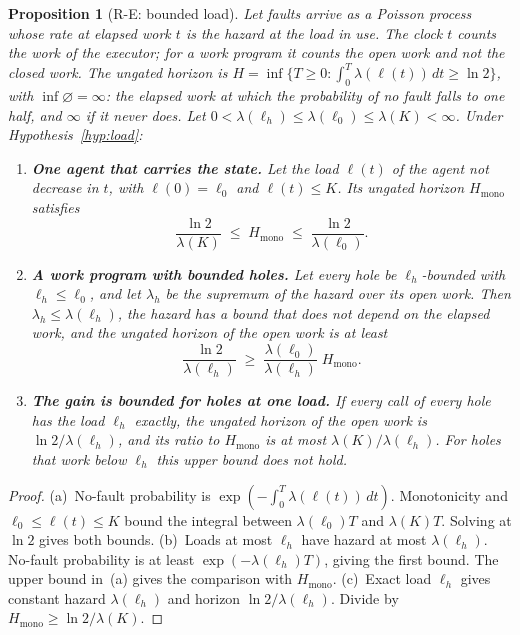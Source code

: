 \documentclass[11pt]{article}
\newtheorem{proposition}{Proposition}
\theoremstyle{definition}
\theoremstyle{remark}
\newcommand{\lh}{\ell_h}
\newcommand{\Hmono}{H_{\mathrm{mono}}}
\begin{document}
\begin{proposition}[R-E: bounded load]\label{prop:load}
Let faults arrive as a Poisson process whose rate at elapsed work $t$ is the hazard at the load in
use. The clock $t$ counts the work of the executor; for a work program it counts the open work and
not the closed work. The \emph{ungated horizon} is
$H=\inf\{T\ge0:\int_0^T\lambda(\ell(t))\,dt\ge\ln 2\}$, with $\inf\varnothing=\infty$: the elapsed
work at which the probability of no fault falls to one half, and $\infty$ if it never does. Let $0<\lambda(\lh)\le\lambda(\ell_0)\le\lambda(K)<\infty$. Under
Hypothesis~\ref{hyp:load}:
\begin{enumerate}[label=\textup{(\alph*)},leftmargin=2em,itemsep=3pt]
\item \textbf{One agent that carries the state.} Let the load $\ell(t)$ of the agent not decrease in
$t$, with $\ell(0)=\ell_0$ and $\ell(t)\le K$. Its ungated horizon $\Hmono$ satisfies
\[
\frac{\ln 2}{\lambda(K)}\;\le\;\Hmono\;\le\;\frac{\ln 2}{\lambda(\ell_0)} .
\]
\item \textbf{A work program with bounded holes.} Let every hole be $\lh$-bounded with
$\lh\le\ell_0$, and let $\lambda_h$ be the supremum of the hazard over its open work. Then
$\lambda_h\le\lambda(\lh)$, the hazard has a bound that does not depend on the elapsed work, and the
ungated horizon of the open work is at least
\[
\frac{\ln 2}{\lambda(\lh)}\;\ge\;\frac{\lambda(\ell_0)}{\lambda(\lh)}\;\Hmono .
\]
\item \textbf{The gain is bounded for holes at one load.} If every call of every hole has the load
$\lh$ exactly, the ungated horizon of the open work is $\ln 2/\lambda(\lh)$, and its ratio to
$\Hmono$ is at most $\lambda(K)/\lambda(\lh)$. For holes that work below $\lh$ this upper bound does
not hold.
\end{enumerate}
\end{proposition}
\begin{proof}
(a)~No-fault probability is $\exp(-\int_0^T\lambda(\ell(t))\,dt)$.
Monotonicity and $\ell_0\le\ell(t)\le K$ bound the integral between
$\lambda(\ell_0)T$ and $\lambda(K)T$. Solving at $\ln2$ gives both bounds.
(b)~Loads at most $\lh$ have hazard at most $\lambda(\lh)$.
No-fault probability is at least $\exp(-\lambda(\lh)T)$, giving the first bound.
The upper bound in~(a) gives the comparison with $\Hmono$.
(c)~Exact load $\lh$ gives constant hazard $\lambda(\lh)$ and horizon $\ln2/\lambda(\lh)$.
Divide by $\Hmono\ge\ln2/\lambda(K)$.
\end{proof}
\end{document}
